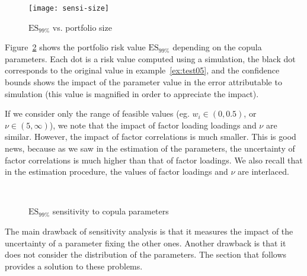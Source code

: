 \documentclass[11pt,fleqn]{book} %
\begin{document}
\begin{figure}[!ht]
	\centering
	\texttt{[image: sensi-size]}
	\caption{$\text{ES}_{99\%}$ vs. portfolio size}
	\label{fig:sensi1}
\end{figure}

\begin{example}
	Figure~\ref{fig:sensi2} shows the portfolio risk value $\text{ES}_{99\%}$ 
	depending on the copula parameters. Each dot is a 
	risk value computed using a simulation, the black dot corresponds to the 
	original value in example~\ref{ex:test05}, and the confidence bounds shows 
	the impact of the parameter value in the error attributable to simulation 
	(this value is magnified in order to appreciate the impact).
	
	If we consider only the range of feasible values (eg. $w_i \in (0,0.5)$, or
	$\nu \in (5,\infty)$), we note that the impact of factor loading loadings
	and $\nu$ are similar. However, the impact of factor correlations is much 
	smaller. This is good news, because as we saw in the estimation of the 
	parameters, the uncertainty of factor correlations is much higher than 
	that of factor loadings. We also recall that in the estimation procedure,
	the values of factor loadings and $\nu$ are interlaced. 
\end{example}

\begin{figure}[!h]
	\centering
	\\
	\caption{$\text{ES}_{99\%}$ sensitivity to copula parameters}
	\label{fig:sensi2}
\end{figure}

The main drawback of sensitivity analysis is that it measures the impact 
of the uncertainty of a parameter fixing the other ones. Another drawback 
is that it does not consider the distribution of the parameters. The 
section that follows provides a solution to these problems.

\end{document}
